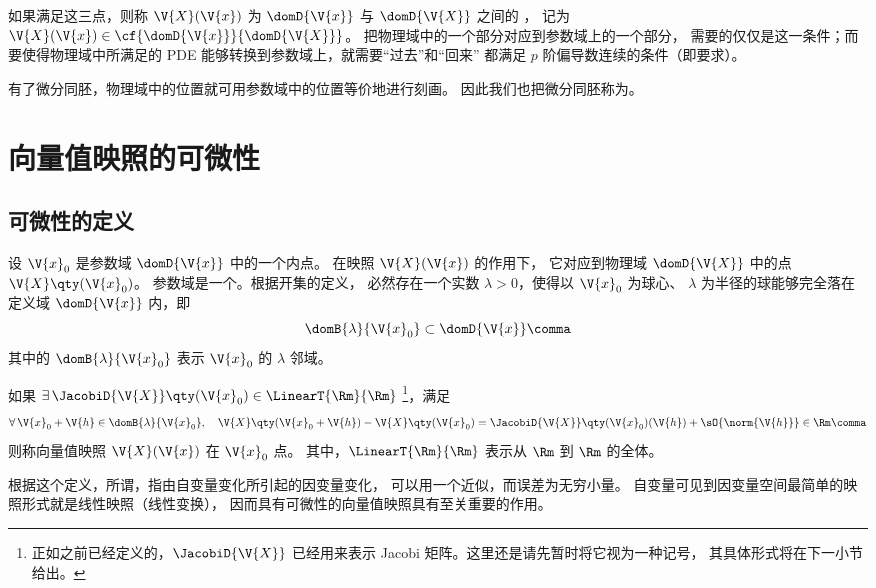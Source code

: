 
如果满足这三点，则称 $\V{X}(\V{x})$ 为 $\domD{\V{x}}$ 与
$\domD{\V{X}}$ 之间的 ，
记为 $\V{X}(\V{x})\in\cf{\domD{\V{x}}}{\domD{\V{X}}}$。
把物理域中的一个部分对应到参数域上的一个部分，
需要的仅仅是这一条件；而要使得物理域中所满足的
PDE 能够转换到参数域上，就需要“过去”和“回来”
都满足 $p$ 阶偏导数连续的条件（即要求）。

有了微分同胚，物理域中的位置就可用参数域中的位置等价地进行刻画。
因此我们也把微分同胚称为。

\section{向量值映照的可微性} \label{sec:向量值映照的可微性}
\subsection{可微性的定义}
设 $\V{x}_0$ 是参数域 $\domD{\V{x}}$ 中的一个内点。
在映照 $\V{X}(\V{x})$ 的作用下，
它对应到物理域 $\domD{\V{X}}$ 中的点 $\V{X}\qty(\V{x}_0)$。
参数域是一个。根据开集的定义，
必然存在一个实数 $\lambda>0$，使得以 $\V{x}_0$ 为球心、
$\lambda$ 为半径的球能够完全落在定义域 $\domD{\V{x}}$ 内，即
\begin{equation}
  \domB{\lambda}{\V{x}_0}\subset\domD{\V{x}} \comma
\end{equation}
其中的 $\domB{\lambda}{\V{x}_0}$ 表示 $\V{x}_0$ 的 $\lambda$ 邻域。

如果 $\exists\,\JacobiD{\V{X}}\qty(\V{x}_0)\in\LinearT{\Rm}{\Rm}$
\footnote{正如之前已经定义的，$\JacobiD{\V{X}}$
  已经用来表示 Jacobi 矩阵。这里还是请先暂时将它视为一种记号，
  其具体形式将在下一小节给出。}，满足
\begin{equation}
  \forall\,\V{x}_0+\V{h}\in\domB{\lambda}{\V{x}_0},\quad
  \V{X}\qty(\V{x}_0+\V{h})-\V{X}\qty(\V{x}_0)
  =\JacobiD{\V{X}}\qty(\V{x}_0)(\V{h})+\sO{\norm{\V{h}}}
  \in\Rm \comma
  \label{eq:向量值映照可微性的定义}
\end{equation}
则称向量值映照 $\V{X}(\V{x})$ 在 $\V{x}_0$ 点。
其中，$\LinearT{\Rm}{\Rm}$ 表示从 $\Rm$ 到 $\Rm$
的全体。

根据这个定义，所谓，指由自变量变化所引起的因变量变化，
可以用一个近似，而误差为无穷小量。
自变量可见到因变量空间最简单的映照形式就是线性映照（线性变换），
因而具有可微性的向量值映照具有至关重要的作用。


